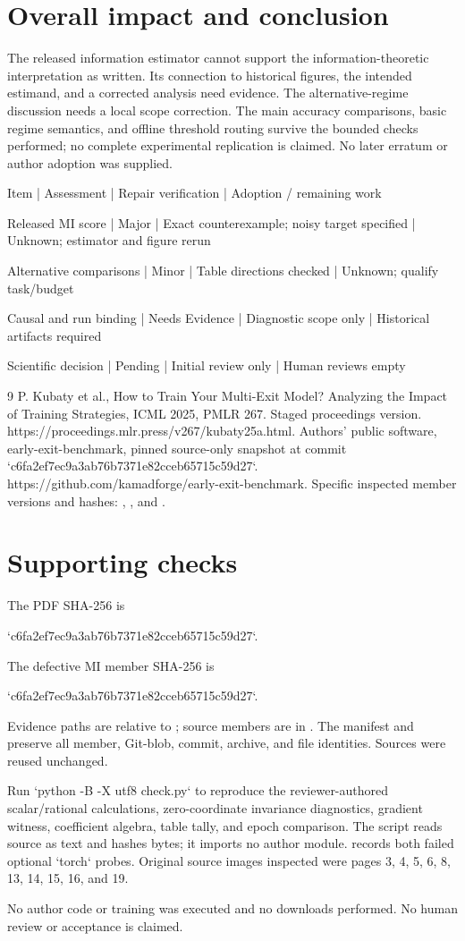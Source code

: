 \documentclass[10pt]{article}
\begin{document}
\section*{Overall impact and conclusion}
The released information estimator cannot support the information-theoretic interpretation as written. Its connection to historical figures, the intended estimand, and a corrected analysis need evidence. The alternative-regime discussion needs a local scope correction. The main accuracy comparisons, basic regime semantics, and offline threshold routing survive the bounded checks performed; no complete experimental replication is claimed. No later erratum or author adoption was supplied.\par
Item | Assessment | Repair verification | Adoption / remaining work\par
Released MI score | Major | Exact counterexample; noisy target specified | Unknown; estimator and figure rerun\par
Alternative comparisons | Minor | Table directions checked | Unknown; qualify task/budget\par
Causal and run binding | Needs Evidence | Diagnostic scope only | Historical artifacts required\par
Scientific decision | Pending | Initial review only | Human reviews empty\par
9 P. Kubaty et al., How to Train Your Multi-Exit Model? Analyzing the Impact of Training Strategies, ICML 2025, PMLR 267. Staged proceedings version. https://proceedings.mlr.press/v267/kubaty25a.html. Authors’ public software, early-exit-benchmark, pinned source-only snapshot at commit `c6fa2ef7ec9a3ab76b7371e82cceb65715c59d27`. https://github.com/kamadforge/early-exit-benchmark. Specific inspected member versions and hashes: , , and .\par
\section*{Supporting checks}
The PDF SHA-256 is\par
`c6fa2ef7ec9a3ab76b7371e82cceb65715c59d27`.\par
The defective MI member SHA-256 is\par
`c6fa2ef7ec9a3ab76b7371e82cceb65715c59d27`.\par
Evidence paths are relative to ; source members are in . The manifest and preserve all member, Git-blob, commit, archive, and file identities. Sources were reused unchanged.\par
Run `python -B -X utf8 check.py` to reproduce the reviewer-authored scalar/rational calculations, zero-coordinate invariance diagnostics, gradient witness, coefficient algebra, table tally, and epoch comparison. The script reads source as text and hashes bytes; it imports no author module. records both failed optional `torch` probes. Original source images inspected were pages 3, 4, 5, 6, 8, 13, 14, 15, 16, and 19.\par
No author code or training was executed and no downloads performed. No human review or acceptance is claimed.\par
\end{document}
